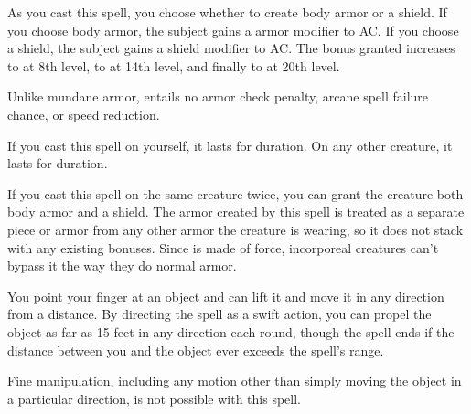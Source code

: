 \spellrng{\rngclose}
\begin{spelleffect}
    As you cast this spell, you choose whether to create body armor or a shield. If you choose body armor, the subject gains a  armor modifier to AC. If you choose a shield, the subject gains a  shield modifier to AC. The bonus granted increases to  at 8th level, to  at 14th level, and finally to  at 20th level. 
  \par Unlike mundane armor,  entails no armor check penalty, arcane spell failure chance, or speed reduction.
  \par If you cast this spell on yourself, it lasts for \durlong duration. On any other creature, it lasts for \durshort duration.
\end{spelleffect}
\begin{spellnotes}
    If you cast this spell on the same creature twice, you can grant the creature both body armor and a shield. The armor created by this spell is treated as a separate piece or armor from any other armor the creature is wearing, so it does not stack with any existing bonuses. Since  is made of force, incorporeal creatures can't bypass it the way they do normal armor.
\end{spellnotes}

\spellrng{\rngclose}
\spelldur{\durshort}
\begin{spelleffect}
  You point your finger at an object and can lift it and move it in any direction from a distance. By directing the spell as a swift action, you can propel the object as far as 15 feet in any direction each round, though the spell ends if the distance between you and the object ever exceeds the spell's range.
\end{spelleffect}
\begin{spellnotes}
  Fine manipulation, including any motion other than simply moving the object in a particular direction, is not possible with this spell.
\end{spellnotes}

